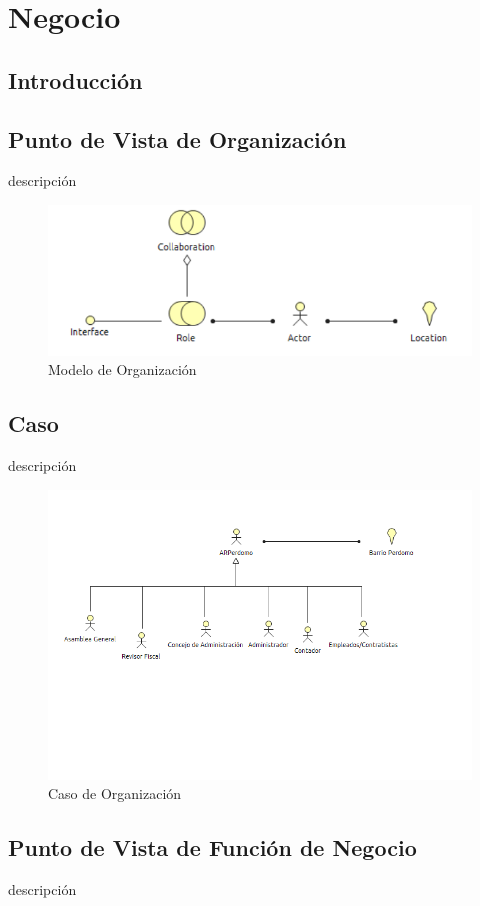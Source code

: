 \chapter{Negocio}
\section{Introducción}
\newpage

\section{Punto de Vista de Organización}
descripción


\begin{figure}[th!]
	\centering
	\includegraphics[width=0.7\linewidth]{arquitectura/negocio/imgs/m_organizacion}
	\caption{Modelo de Organización}
\end{figure}

\newpage
\section{Caso}
descripción

\begin{figure}[th!]
	\centering
	\includegraphics[width=0.7\linewidth]{arquitectura/negocio/imgs/organizacion}
	\caption{Caso de Organización}
\end{figure}
\newpage

\section{Punto de Vista de Función de Negocio}
descripción

